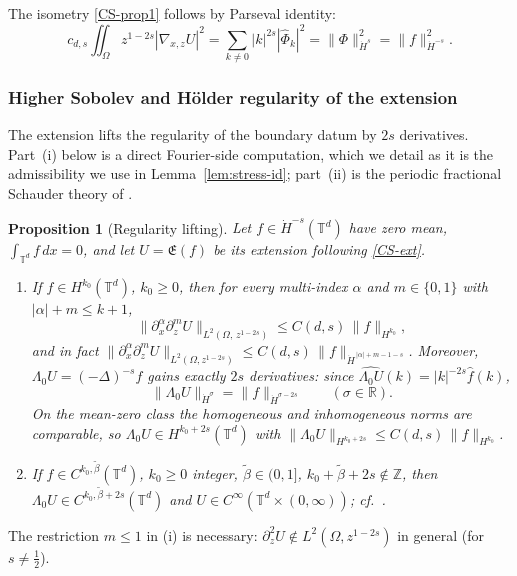 \documentclass[12pt,a4paper,twoside]{article}
\newcommand{\Grad}{\nabla}
\newtheorem{prop}[thm]{Proposition}
\numberwithin{equation}{section}%
\begin{document}
The isometry \eqref{CS-prop1} follows by Parseval identity: $$c_{d,s}\iint_\Omega z^{1-2s}|\Grad_{x,z}U|^2=\sum_{k\neq0}|k|^{2s}|\hat\Phi_k|^2=\|\Phi\|_{\dot H^s}^2=\|f\|_{\dot H^{-s}}^2.$$

\subsubsection*{Higher Sobolev and H\"older regularity of the extension}

The extension lifts the regularity of the boundary datum by $2s$ derivatives. Part~(i) below is a
direct Fourier-side computation, which we detail as it is the admissibility we use in
Lemma~\ref{lem:stress-id}; part~(ii) is the periodic fractional Schauder theory of
\cite[Thm.~1.4]{RS2016}.

\begin{prop}[Regularity lifting]\label{prop:CS_regularity}
	Let $f\in\dot H^{-s}(\mathbb T^d)$ have zero mean, $\int_{\mathbb{T}^d} f\,dx = 0$,
	and let $U=\mathfrak{E}(f)$ be its extension following \eqref{CS-ext}.
	\begin{enumerate}[leftmargin=*]
		\item If $f\in H^{k_0}(\mathbb T^d)$, $k_0\ge0$, then for every multi-index $\alpha$ and
		$m\in\{0,1\}$ with $|\alpha|+m\le k+1$,
		\[
		\|\partial_x^\alpha\partial_z^m U\|_{L^2(\Omega,\,z^{1-2s})}\le C(d,s)\,\|f\|_{H^{k_0}},
		\]
		and in fact $\|\partial_x^\alpha\partial_z^m U\|_{L^2(\Omega,z^{1-2s})}
		\le C(d,s)\,\|f\|_{\dot H^{\,|\alpha|+m-1-s}}$. 
		Moreover, $\Lambda_0 U=(-\Delta)^{-s}f$ gains exactly $2s$ derivatives: since
		$\widehat{\Lambda_0 U}(k)=|k|^{-2s}\hat f(k)$,
		\[
		\|\Lambda_0 U\|_{\dot H^{\sigma}}=\|f\|_{\dot H^{\sigma-2s}}\qquad(\sigma\in\mathbb R).
		\]
		On the mean-zero class the homogeneous and inhomogeneous norms are comparable, so
		$\Lambda_0 U\in H^{k_0+2s}(\mathbb T^d)$ with $\|\Lambda_0 U\|_{H^{k_0+2s}}\le C(d,s)\,\|f\|_{H^{k_0}}$.
		\item If $f \in C^{k_0,\tilde{\beta}}(\mathbb{T}^d)$, $k_0\ge0$ integer, $\tilde{\beta}\in(0,1]$,
		$k_0+\tilde{\beta}+2s\notin\mathbb Z$, then $\Lambda_0 U \in C^{k_0,\tilde{\beta}+2s}(\mathbb{T}^d)$
		and $U\in C^\infty(\mathbb T^d\times(0,\infty))$; cf.\ \cite[Thm.~1.4]{RS2016}.
	\end{enumerate}
\end{prop}

The restriction $m\le1$ in (i) is necessary: $\partial_z^2 U\notin L^2(\Omega,z^{1-2s})$ in general
(for $s\ne\tfrac12$).
\end{document}
